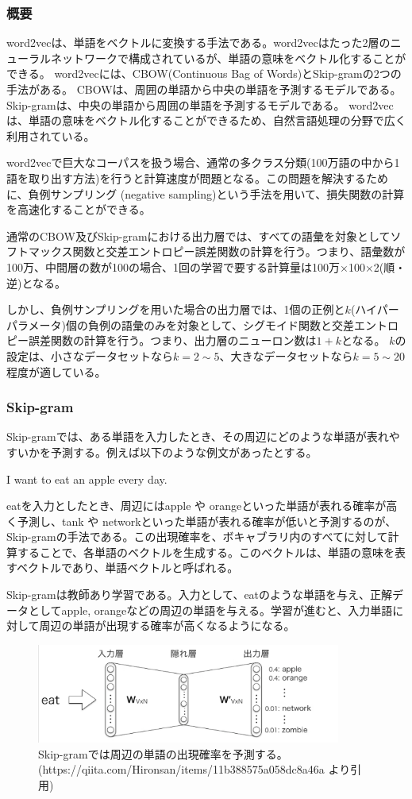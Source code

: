 \documentclass{ltjsarticle}
\begin{document}
\subsubsection{概要}
word2vecは、単語をベクトルに変換する手法である。word2vecはたった2層のニューラルネットワークで構成されているが、単語の意味をベクトル化することができる。
word2vecには、CBOW(Continuous Bag of Words)とSkip-gramの2つの手法がある。
CBOWは、周囲の単語から中央の単語を予測するモデルである。Skip-gramは、中央の単語から周囲の単語を予測するモデルである。
word2vecは、単語の意味をベクトル化することができるため、自然言語処理の分野で広く利用されている。
\par
word2vecで巨大なコーパスを扱う場合、通常の多クラス分類(100万語の中から1語を取り出す方法)を行うと計算速度が問題となる。この問題を解決するために、負例サンプリング (negative sampling)という手法を用いて、損失関数の計算を高速化することができる。
\par
通常のCBOW及びSkip-gramにおける出力層では、すべての語彙を対象としてソフトマックス関数と交差エントロピー誤差関数の計算を行う。つまり、語彙数が100万、中間層の数が100の場合、1回の学習で要する計算量は100万×100×2(順・逆)となる。
\par
しかし、負例サンプリングを用いた場合の出力層では、1個の正例と$k$(ハイパーパラメータ)個の負例の語彙のみを対象として、シグモイド関数と交差エントロピー誤差関数の計算を行う。つまり、出力層のニューロン数は$1+k$となる。
$k$の設定は、小さなデータセットなら$k=2\sim5$、大きなデータセットなら$k=5\sim20$程度が適している。

\subsubsection{Skip-gram}
Skip-gramでは、ある単語を入力したとき、その周辺にどのような単語が表れやすいかを予測する。例えば以下のような例文があったとする。
\begin{itembox}[l]{}
    I want to eat an apple every day.
\end{itembox}
eatを入力としたとき、周辺にはapple や orangeといった単語が表れる確率が高く予測し、tank や networkといった単語が表れる確率が低いと予測するのが、Skip-gramの手法である。この出現確率を、ボキャブラリ内のすべてに対して計算することで、各単語のベクトルを生成する。このベクトルは、単語の意味を表すベクトルであり、単語ベクトルと呼ばれる。
\par
Skip-gramは教師あり学習である。入力として、eatのような単語を与え、正解データとしてapple, orangeなどの周辺の単語を与える。学習が進むと、入力単語に対して周辺の単語が出現する確率が高くなるようになる。
\begin{figure}[htbp]
  \centering
  \includegraphics[width=10cm]{./capture/Skip-gram_1.png}
  \caption{Skip-gramでは周辺の単語の出現確率を予測する。(https://qiita.com/Hironsan/items/11b388575a058dc8a46a より引用)}
  \label{fig:Skip-gram_1}
\end{figure}
\end{document}
